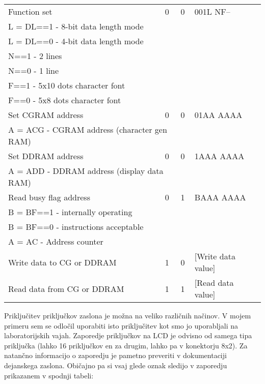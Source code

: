\documentclass[12pt,a4paper,twoside,openright,slovene]{book}
\begin{document}
\begin{footnotesize}
\begin{center}
\begin{longtable}{lccl}
            Function set                                & 0     & 0     & 001L NF-- \\
                  \multicolumn{3}{l}{\quad L = DL==1 - 8-bit data length mode} \\
                  \multicolumn{3}{l}{\quad L = DL==0 - 4-bit data length mode} \\
                  \multicolumn{3}{l}{\quad N==1 - 2 lines} \\
                  \multicolumn{3}{l}{\quad N==0 - 1 line} \\
                  \multicolumn{3}{l}{\quad F==1 - 5x10 dots character font} \\
                  \multicolumn{3}{l}{\quad F==0 - 5x8 dots character font} \\ \hline
            Set CGRAM address                           &0      & 0     & 01AA AAAA \\
                \multicolumn{3}{l}{\quad A = ACG - CGRAM address (character gen RAM)} \\ \hline
            Set DDRAM address                           & 0     & 0     & 1AAA AAAA \\
                \multicolumn{3}{l}{\quad A = ADD - DDRAM address (display data RAM)} \\ \hline
            Read busy flag address                      & 0     & 1     & BAAA AAAA \\
                \multicolumn{3}{l}{\quad B = BF==1 - internally operating} \\
                \multicolumn{3}{l}{\quad B = BF==0 - instructions acceptable} \\
                \multicolumn{3}{l}{\quad A = AC - Address counter} \\ \hline
            Write data to CG or DDRAM                   & 1     & 0     & [Write data value] \\ \hline
            Read data from CG or DDRAM                  & 1     & 1     & [Read data value] \\ \hline
        \end{longtable}
	\end{center}
\end{footnotesize}

Priključitev priključkov zaslona je možna na veliko različnih načinov. V mojem primeru sem se odločil uporabiti isto priključitev kot smo jo uporabljali na laboratorijskih vajah. Zaporedje priključkov na LCD je odvisno od samega tipa priključka (lahko 16 priključkov en za drugim, lahko pa v konektorju 8x2). Za natančno informacijo o zaporedju je pametno preveriti v dokumentaciji dejanskega zaslona. Običajno pa si vsaj glede oznak sledijo v zaporedju prikazanem v spodnji tabeli:
\end{document}
